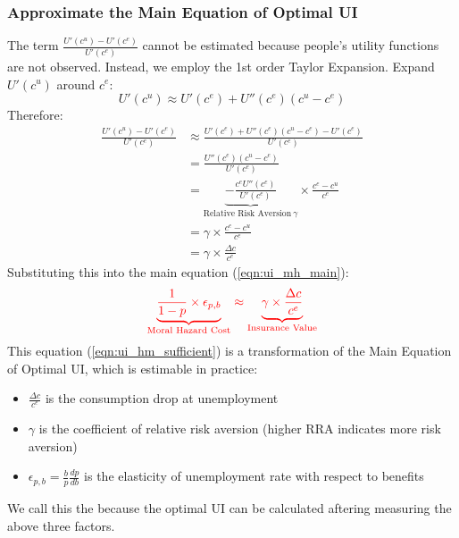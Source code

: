         \subsubsection{Approximate the Main Equation of Optimal UI}
            The term $\frac{U'(c^u)-U'(c^e)}{U'(c^e)}$ cannot be estimated because people's utility functions are not observed. Instead, we employ the 1st order Taylor Expansion. Expand $U'(c^u)$ around $c^e$:
            $$U'(c^u) \approx U'(c^e) + U''(c^e)(c^u-c^e)$$
            Therefore:
            \begin{equation*}
                \begin{split}
                \frac{U'(c^u)-U'(c^e)}{U'(c^e)} & \approx \frac{U'(c^e) + U''(c^e)(c^u-c^e)-U'(c^e)}{U'(c^e)}\\
                & = \frac{U''(c^e)(c^u-c^e)}{U'(c^e)}\\
                & = \underbrace{-\frac{c^e U''(c^e)}{U'(c^e)}}_{\text{Relative\ Risk\ Aversion}\ \gamma} \times \frac{c^e-c^u}{c^e}\\
                & = \gamma \times \frac{c^e-c^u}{c^e}\\
                & = \gamma \times \frac{\Delta c}{c^e}
            \end{split}
            \end{equation*}
            Substituting this into the main equation (\ref{eqn:ui_mh_main}):
            \begin{equation}
            \label{eqn:ui_hm_sufficient}
            \color{red}
                \underbrace{\frac{1}{1-p}\times{\epsilon_{p,b}}}_{\text{Moral\ Hazard\ Cost}} \approx \underbrace{\gamma \times \frac{\Delta c}{c^e}}_{\text{Insurance\ Value}}
            \end{equation}
            This equation (\ref{eqn:ui_hm_sufficient}) is a transformation of the Main Equation of Optimal UI, which is estimable in practice:
            \begin{itemize}
                \item $\frac{\Delta c}{c^e}$ is the consumption drop at unemployment
                \item $\gamma$ is the coefficient of relative risk aversion (higher RRA indicates more risk aversion)
                \item $\epsilon_{p,b} = \frac{b}{p}\frac{dp}{db}$ is the elasticity of unemployment rate with respect to benefits
            \end{itemize}
            We call this the  because the optimal UI can be calculated aftering measuring the above three factors.
            
